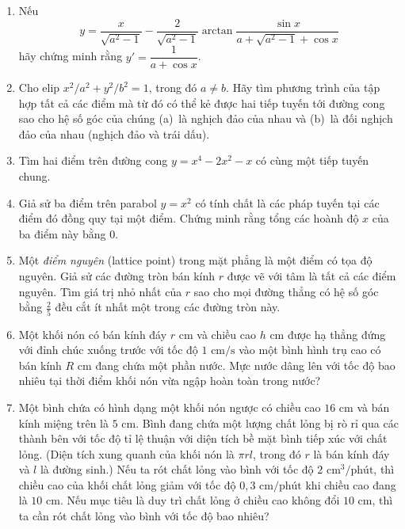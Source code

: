 \begin{minipage}[t][0.91\textheight]{0.73\textwidth}
\begin{enumerate}[label=\bfseries\arabic*., leftmargin=*, itemsep=0.82em, topsep=0pt, parsep=0pt]
        \item Nếu
        \[
        y = \frac{x}{\sqrt{a^2 - 1}} - \frac{2}{\sqrt{a^2 - 1}} \arctan \frac{\sin x}{a + \sqrt{a^2 - 1} + \cos x}
        \]
        hãy chứng minh rằng $y' = \dfrac{1}{a + \cos x}$.

        \item Cho elip $x^2/a^2 + y^2/b^2 = 1$, trong đó $a \neq b$. Hãy tìm phương trình của tập hợp tất cả các điểm mà từ đó có thể kẻ được hai tiếp tuyến tới đường cong sao cho hệ số góc của chúng (a)~là nghịch đảo của nhau và (b)~là đối nghịch đảo của nhau (nghịch đảo và trái dấu).

        \item Tìm hai điểm trên đường cong $y = x^4 - 2x^2 - x$ có cùng một tiếp tuyến chung.

        \item Giả sử ba điểm trên parabol $y = x^2$ có tính chất là các pháp tuyến tại các điểm đó đồng quy tại một điểm. Chứng minh rằng tổng các hoành độ $x$ của ba điểm này bằng $0$.

        \item Một \textit{điểm nguyên} (lattice point) trong mặt phẳng là một điểm có tọa độ nguyên. Giả sử các đường tròn bán kính $r$ được vẽ với tâm là tất cả các điểm nguyên. Tìm giá trị nhỏ nhất của $r$ sao cho mọi đường thẳng có hệ số góc bằng $\frac{2}{5}$ đều cắt ít nhất một trong các đường tròn này.

        \item Một khối nón có bán kính đáy $r\text{ cm}$ và chiều cao $h\text{ cm}$ được hạ thẳng đứng với đỉnh chúc xuống trước với tốc độ $1\text{ cm/s}$ vào một bình hình trụ cao có bán kính $R\text{ cm}$ đang chứa một phần nước. Mực nước dâng lên với tốc độ bao nhiêu tại thời điểm khối nón vừa ngập hoàn toàn trong nước?

        \item Một bình chứa có hình dạng một khối nón ngược có chiều cao $16\text{ cm}$ và bán kính miệng trên là $5\text{ cm}$. Bình đang chứa một lượng chất lỏng bị rò rỉ qua các thành bên với tốc độ tỉ lệ thuận với diện tích bề mặt bình tiếp xúc với chất lỏng. (Diện tích xung quanh của khối nón là $\pi r l$, trong đó $r$ là bán kính đáy và $l$ là đường sinh.) Nếu ta rót chất lỏng vào bình với tốc độ $2\text{ cm}^3/\text{phút}$, thì chiều cao của khối chất lỏng giảm với tốc độ $0{,}3\text{ cm/phút}$ khi chiều cao đang là $10\text{ cm}$. Nếu mục tiêu là duy trì chất lỏng ở chiều cao không đổi $10\text{ cm}$, thì ta cần rót chất lỏng vào bình với tốc độ bao nhiêu?
    \end{enumerate}
\end{minipage}

